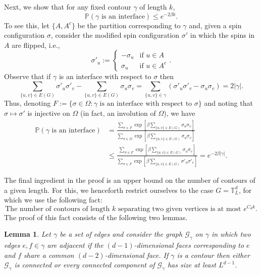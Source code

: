 \documentclass[12pt,reqno]{article}
\def\T{\mathbb{T}}
\newtheorem{lemma}[theorem]{Lemma}
\renewcommand{\Pr}{\mathbb{P}}
\begin{document}
Next, we show that for any fixed contour $\gamma$ of length $k$,
\begin{equation}\label{eq:low_temp_Ising_prob_of_interface}
\Pr(\gamma\text{ is an interface}) \le e^{-2\beta k} .
\end{equation}
To see this, let $\{A,A^c\}$ be the partition corresponding to
$\gamma$ and, given a spin configuration $\sigma$, consider the
modified spin configuration $\sigma'$ in which the spins in $A$ are
flipped, i.e.,
\[ \sigma'_u := \begin{cases}
 -\sigma_u &\text{if } u \in A\\
 \sigma_u &\text{if } u \in A^c
\end{cases} .\]
Observe that if $\gamma$ is an interface with respect to $\sigma$
then
\[ \sum_{\{u,v\}\in E(G)}\sigma'_u \sigma'_v - \sum_{\{u,v\}\in E(G)}\sigma_u \sigma_v = \sum_{\{u,v\}\in \gamma} (\sigma'_u \sigma'_v - \sigma_u \sigma_v) = 2 |\gamma| . \]
Thus, denoting $F := \{ \sigma \in \Omega : \gamma\text{ is an interface with
respect to }\sigma \}$ and noting that $\sigma \mapsto \sigma'$ is
injective on $\Omega$ (in fact, an involution of $\Omega$), we have
\begin{align*}
\Pr(\gamma\text{ is an interface})
 &= \frac{\sum_{\sigma \in F} \exp \left[\beta \sum_{\{u,v\}\in E(G)}\sigma_u \sigma_v\right]}{\sum_{\sigma \in \Omega} \exp \left[\beta \sum_{\{u,v\}\in E(G)}\sigma_u \sigma_v\right]} \\
 &\le \frac{\sum_{\sigma \in F} \exp \left[\beta \sum_{\{u,v\}\in E(G)}\sigma_u \sigma_v\right]}{\sum_{\sigma \in F} \exp \left[\beta \sum_{\{u,v\}\in E(G)}\sigma'_u \sigma'_v\right]} = e^{-2\beta |\gamma|} .
\end{align*}

The final ingredient in the proof is an upper bound on the number of contours of a given length.
For this, we henceforth restrict ourselves to the case $G = \T_L^d$, for which we use the following fact:
\begin{equation}\label{eq:low_temp_Ising_number_of_contours}
\text{The number of contours of length $k$ separating two given vertices is at most }e^{C_d k} .
\end{equation}
The proof of this fact consists of the following two lemmas.

\begin{lemma}
    Let $\gamma$ be a set of edges and consider the graph $\mathcal{G}_\gamma$ on $\gamma$ in which two edges $e,f \in \gamma$ are adjacent if the $(d-1)$-dimensional faces corresponding to $e$ and $f$ share a common $(d-2)$-dimensional face. If $\gamma$ is a contour then either $\mathcal{G}_\gamma$ is connected or every connected component of $\mathcal{G}_\gamma$ has size at least $L^{d-1}$.
\end{lemma}
\end{document}
